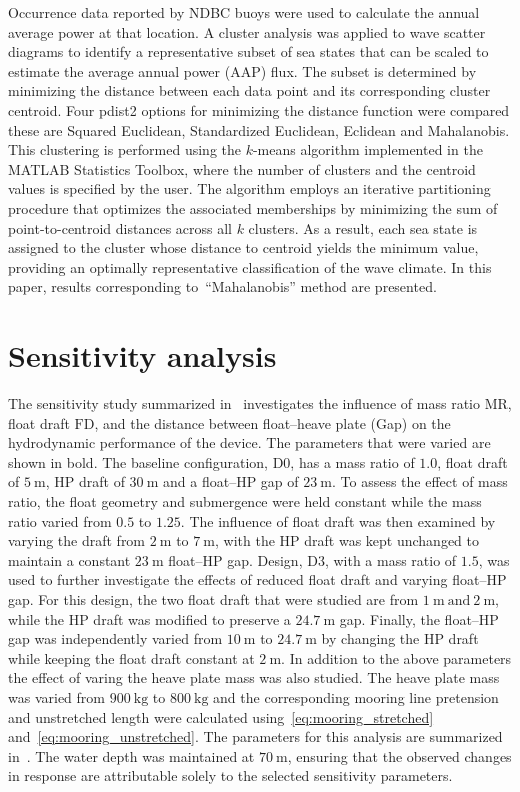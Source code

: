 \documentclass[10pt,journal,a4paper,twoside]{./IMEJ}
\begin{document}
Occurrence data reported by NDBC buoys were used to calculate the annual average power at that location. A cluster analysis was applied to wave scatter diagrams to identify a representative subset of sea states that can be scaled to estimate the average annual power (AAP) flux. The subset is determined by minimizing the distance between each data point and its corresponding cluster centroid. Four pdist2 options for minimizing the distance function were compared these are Squared Euclidean, Standardized Euclidean, Eclidean and Mahalanobis.  This clustering is performed using the \(k\)-means algorithm implemented in the MATLAB Statistics Toolbox, where the number of clusters and the centroid values is specified by the user. The algorithm employs an iterative partitioning procedure that optimizes the associated memberships by minimizing the sum of point-to-centroid distances across all $k$ clusters. As a result, each sea state is assigned to the cluster whose distance to centroid yields the minimum value, providing an optimally representative classification of the wave climate. In this paper, results corresponding to~\enquote{Mahalanobis} method are presented.
\section{Sensitivity analysis}
\label{sec:sensitivity_analysis}
The sensitivity study summarized in~ investigates the influence of mass ratio \(\mathrm{MR}\), float draft \(\mathrm{FD}\), and the distance between float–heave plate (Gap) on the hydrodynamic performance of the device. The parameters that were varied are shown in bold. The baseline configuration, D0, has a mass ratio of \(1.0\), float draft of \(5~\mathrm{m}\), HP draft of \(30~\mathrm{m}\) and a float–HP gap of \(23~\mathrm{m}\). To assess the effect of mass ratio, the float geometry and submergence were held constant while the mass ratio varied from \(0.5\) to \(1.25\). The influence of float draft was then examined by varying the draft from \(2~\mathrm{m}\) to \(7~\mathrm{m}\), with the HP draft was kept unchanged to maintain a constant \(23~\mathrm{m}\) float–HP gap. Design, D3, with a mass ratio of \(1.5\), was used to further investigate the effects of reduced float draft and varying float–HP gap. For this design, the two float draft that were studied are from \(1~\mathrm{m}~\text{and}~2~\mathrm{m}\), while the HP draft was modified to preserve a \(24.7~\mathrm{m}\) gap. Finally, the float–HP gap was independently varied from \(10~\mathrm{m}\) to \(24.7~\mathrm{m}\) by changing the HP draft while keeping the float draft constant at \(2~\mathrm{m}\). 
In addition to the above parameters the effect of varing the heave plate mass was also studied. The heave plate mass was varied from \(900~\mathrm{kg}\) to \(800~\mathrm{kg}\) and the corresponding mooring line pretension and unstretched length were calculated using~\eqref{eq:mooring_stretched} and~\eqref{eq:mooring_unstretched}. The parameters for this analysis are summarized in~.
The water depth was maintained at \(70~\mathrm{m}\), ensuring that the observed changes in response are attributable solely to the selected sensitivity parameters.
\end{document}
